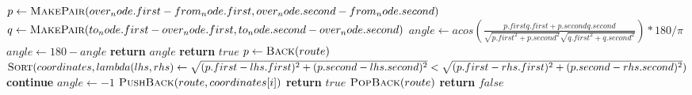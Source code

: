 \documentclass[a4paper,10pt,ngerman]{scrartcl}
\begin{document}
    \begin{algorithm}
        \begin{algorithmic}[1]
                \State $p \gets \Call{MakePair}{over_node.first-from_node.first,over_node.second-from_node.second}$
                \State $q \gets \Call{MakePair}{to_node.first-over_node.first,to_node.second-over_node.second}$
                \State $angle \gets acos(\frac{p.firstq.first+p.secondq.second}{\sqrt{p.first^2+p.second^2}\sqrt{q.first^2+q.second^2}})*180/\pi$
                    \State $angle \gets 180-angle$
                \EndIf
                \State \textbf{return} $angle$
            \EndFunction
            \State
                    \State \textbf{return} $true$
                \EndIf
                    \State $p \gets \Call{Back}{route}$
                    \State $\Call{Sort}{coordinates,lambda (lhs,rhs) \gets \sqrt{(p.first-lhs.first)^2+(p.second-lhs.second)^2}<\sqrt{(p.first-rhs.first)^2+(p.second-rhs.second)^2}}$
                \EndIf
                        \State \textbf{continue}
                    \EndIf
                    \State $angle \gets -1$
                    \EndIf
                        \State $\Call{PushBack}{route,coordinates[i]}$
                            \State \textbf{return} $true$
                        \Else
                            \State $\Call{PopBack}{route}$
                        \EndIf
                    \EndIf
                \EndFor
                \State \textbf{return} $false$
            \EndFunction
\end{algorithmic}\label{alg:algorithm}
    \end{algorithm}

    \newpage
\end{document}
